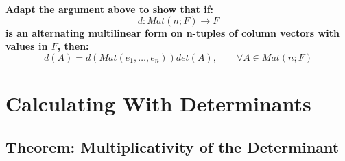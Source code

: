 \documentclass{exam}
\begin{document}
\begin{questions}

\question \textbf{Adapt the argument above to show that if:
\[
d : Mat(n;F) \to F
\]
is an alternating multilinear form on n-tuples of column vectors with values in $F$, then:
\[
d(A) = d(Mat(e_{1}, \ldots, e_{n}))det(A), \qquad \forall A \in Mat(n;F)
\]
}

\end{questions}

\section{Calculating With Determinants}

\subsection{Theorem: Multiplicativity of the Determinant}

\end{document}
